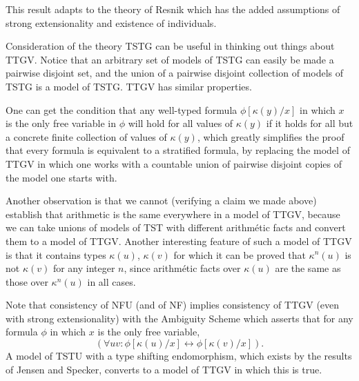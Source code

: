 \documentclass[12pt]{article}
\begin{document}
This result adapts to the theory of Resnik which has the added assumptions of strong extensionality and existence of individuals.

Consideration of the theory TSTG can be useful in thinking out things about TTGV.  Notice that
an arbitrary set of models of TSTG can easily be made a pairwise disjoint set, and the union of a pairwise disjoint collection of models of TSTG is a model of TSTG.  TTGV has similar properties.

One can get the condition that any well-typed formula $\phi[\kappa(y)/x]$
in which $x$ is the only free variable in $\phi$
will hold for all values of $\kappa(y)$ if it holds for all but a concrete finite collection of values of $\kappa(y)$, which greatly simplifies the proof that every formula is equivalent to a stratified formula, by replacing  the model of TTGV in which one works with a countable union of pairwise disjoint copies of the model one starts with.

Another observation is that we cannot (verifying a claim we made above) establish that arithmetic is the same everywhere in a model of TTGV, because we can take unions of models of TST with different arithm\'etic facts and convert them to a model of TTGV.  Another interesting feature of such a model of TTGV is that it contains types $\kappa(u)$, $\kappa(v)$ for which it can be proved that $\kappa^n(u)$ is not $\kappa(v)$ for any integer $n$, since arithm\'etic facts over $\kappa(u)$ are the same as those over $\kappa^n(u)$ in all cases.

Note that consistency of NFU (and of NF) implies consistency of TTGV (even with strong extensionality) with the Ambiguity Scheme which asserts that for any  formula $\phi$ in which $x$ is the only free variable, $$(\forall uv:\phi[\kappa(u)/x]\leftrightarrow \phi[\kappa(v)/x]).$$  A model of TSTU with a type shifting endomorphism, which exists by the results of Jensen and Specker, converts to a model of TTGV in which this is true.

\end{document}
